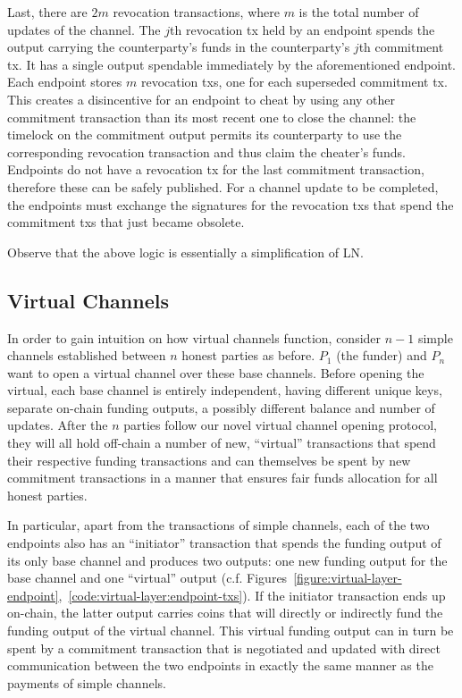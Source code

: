  Last, there are $2m$ revocation transactions, where $m$ is the total number of
  updates of the channel. The $j$th revocation tx held by an endpoint spends the
  output carrying the counterparty's funds in the counterparty's $j$th
  commitment tx. It has a single output spendable immediately by the
  aforementioned endpoint. Each endpoint stores $m$ revocation txs, one for each
  superseded commitment tx. This creates a disincentive for an endpoint to cheat
  by using any other commitment transaction than its most recent one to close
  the channel: the timelock on the commitment output permits its counterparty to
  use the corresponding revocation transaction and thus claim the cheater's
  funds.  Endpoints do not have a revocation tx for the last commitment
  transaction, therefore these can be safely published. For a channel update to
  be completed, the endpoints must exchange the signatures for the revocation
  txs that spend the commitment txs that just became obsolete.

  Observe that the above logic is essentially a simplification of LN.

\subsection{Virtual Channels}
  In order to gain intuition on how virtual channels function, consider $n-1$
  simple channels established between $n$ honest parties as before. $P_1$ (the
  funder) and $P_n$ want to open a virtual channel over these base channels.
  Before opening the virtual, each base channel is entirely independent, having
  different unique keys, separate on-chain funding outputs, a possibly different
  balance and number of updates. After the $n$ parties follow our novel virtual
  channel opening protocol, they will all hold off-chain a number of new,
  ``virtual'' transactions that spend their respective funding transactions and
  can themselves be spent by new commitment transactions in a manner that
  ensures fair funds allocation for all honest parties.

  In particular, apart from the transactions of simple channels, each of the two
  endpoints also has an ``initiator'' transaction that spends the funding output
  of its only base channel and produces two outputs: one new funding output for
  the base channel and one ``virtual'' output (c.f.
  Figures~\ref{figure:virtual-layer-endpoint},~\ref{code:virtual-layer:endpoint-txs}).
  If the
  initiator 
  transaction ends up on-chain, the latter output carries coins that
  will directly or indirectly fund the funding output of the virtual channel.
  This virtual funding output can in turn be spent by a commitment transaction
  that is negotiated and updated with direct communication between the two
  endpoints in exactly the same manner as the payments of simple channels.

